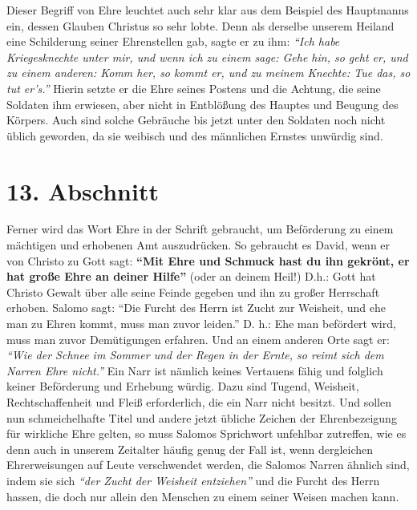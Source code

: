Dieser Begriff von Ehre leuchtet auch sehr klar aus dem Beispiel des
Hauptmanns ein, dessen Glauben Christus so sehr lobte. Denn als derselbe unserem
Heiland eine Schilderung seiner Ehrenstellen
 gab, sagte er zu ihm:
\textit{"`Ich habe
Kriegesknechte unter mir, und wenn ich zu einem sage: Gehe hin, so geht er, und
zu einem anderen: Komm her, so kommt er, und zu meinem Knechte: Tue das, so tut
er’s."'}
Hierin setzte er die Ehre seines Postens und die
Achtung, die seine Soldaten ihm erwiesen, aber nicht
in
Entblößung des Hauptes
und Beugung des Körpers. Auch sind solche Gebräuche bis jetzt unter den Soldaten
noch nicht üblich geworden, da sie weibisch und des männlichen
Ernstes unwürdig
sind.

\section{13. Abschnitt} \label{kap9_ab13}

Ferner wird das Wort Ehre in der Schrift gebraucht, um Beförderung zu einem
mächtigen und erhobenen Amt auszudrücken. So gebraucht es
David, wenn er von
Christo zu Gott sagt:
\textbf{"`Mit Ehre und Schmuck hast du ihn gekrönt, er hat große
Ehre an deiner Hilfe"'}
(oder an deinem Heil!) D.h.: Gott hat Christo Gewalt über alle seine Feinde
gegeben und ihn zu großer
Herrschaft erhoben. Salomo sagt:
"`Die Furcht des Herrn ist Zucht zur Weisheit,
und ehe man zu Ehren kommt, muss man zuvor leiden."'
D. h.: Ehe man befördert wird, muss man zuvor Demütigungen
erfahren. Und an
einem anderen Orte sagt er:
\textit{"`Wie der Schnee im Sommer und der Regen in der
Ernte, so reimt sich dem Narren Ehre nicht."'}
Ein Narr ist
nämlich keines Vertauens fähig und folglich keiner Beförderung und Erhebung
würdig. Dazu sind Tugend, Weisheit, Rechtschaffenheit und Fleiß erforderlich,
die ein Narr nicht besitzt. Und sollen nun schmeichelhafte Titel und andere
jetzt übliche Zeichen der Ehrenbezeigung für wirkliche Ehre gelten, so muss
Salomos Sprichwort unfehlbar zutreffen, wie es denn auch in unserem Zeitalter
häufig genug der Fall ist, wenn dergleichen Ehrerweisungen auf Leute
verschwendet werden, die Salomos Narren ähnlich sind, indem sie sich
\textit{"`der Zucht der Weisheit entziehen"'}
und die Furcht des
Herrn hassen, die doch nur allein den Menschen zu einem seiner Weisen machen
kann.

